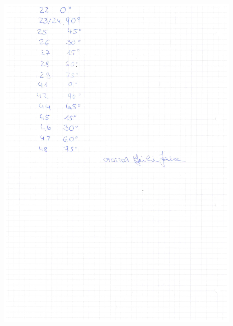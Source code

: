 \begin{minipage}{\textwidth}
	\centering
	\includegraphics[width=0.9\textwidth]{../figures/Laborbuch2Holo.pdf}
\end{minipage}